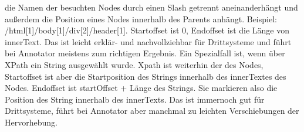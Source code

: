     die Namen der besuchten Nodes durch einen Slash getrennt aneinanderhängt
    und außerdem die Position eines Nodes innerhalb des Parents anhängt.
    Beispiel: /html[1]/body[1]/div[2]/header[1].
    Startoffset ist 0, Endoffset ist die Länge von innerText.
    Das ist leicht erklär- und nachvollziehbar für Drittsysteme und führt bei Annotator meistens zum richtigen Ergebnis.
    Ein Spezialfall ist, wenn über XPath ein String ausgewählt wurde.
    Xpath ist weiterhin der des Nodes, Startoffset ist aber die Startposition des Strings innerhalb des innerTextes des Nodes.
    Endoffset ist startOffset + Länge des Strings.
    Sie markieren also die Position des String innerhalb des innerTexts.
    Das ist immernoch gut für Drittsysteme, führt bei Annotator aber manchmal zu leichten Verschiebungen der Hervorhebung.

